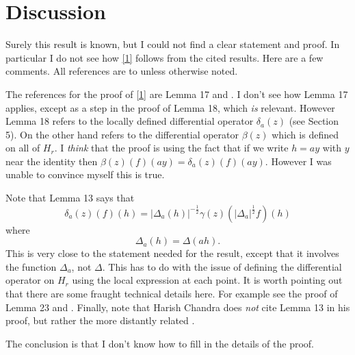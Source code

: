 \documentclass{article}
\theoremstyle{definition}
\numberwithin{equation}{section}
\renewcommand{\-}{\hyp{}}
\begin{document}
\section{Discussion}

Surely this result is known, but I could not find a clear statement and proof. In particular I do not see how \eqref{1}
follows from the cited results. Here are a few comments. All references are to \cite{HC1} unless otherwise noted. 

The references for the proof of \eqref{1} are Lemma 17 and 
 \cite[Theorem 2]{HC2}. I don't see how Lemma 17 applies, except as a step in the proof of Lemma 18, which {\it is} relevant. 
However Lemma 18 refers to the locally defined differential operator $\delta_a(z)$ (see Section 5). On the other hand 
\cite[Theorem 2]{HC2} refers to the differential operator $\beta(z)$ which is defined on all of $H_r$. 
I {\it think} that the proof is using the fact that if we write $h=ay$ with $y$ near the identity then
$\beta(z)(f)(ay)=\delta_a(z)(f)(ay)$. However I was unable to convince myself this is true.

Note that Lemma 13 says that
$$
\delta_a(z)(f)(h)=|\Delta_a(h)|^{-\frac12}\gamma(z)(|\Delta_a|^{\frac12}f)(h)
$$
where 
$$
\Delta_a(h)=\Delta(ah).
$$
This is very close to the statement needed for the result, except that it involves the function $\Delta_a$, not $\Delta$.
This has to do with the issue of defining the differential operator on $H_r$ using the local expression at each point.
It is worth pointing out that there are some fraught technical details here. For example see the proof of Lemma 23 and 
\cite[Lemma 25]{HC2}.
Finally, note that Harish Chandra does {\it not} cite Lemma 13 in his proof, but rather the more distantly related \cite[Theorem 2]{HC2}.

The conclusion is that I don't know how to fill in the details of the proof.







%

\end{document}
